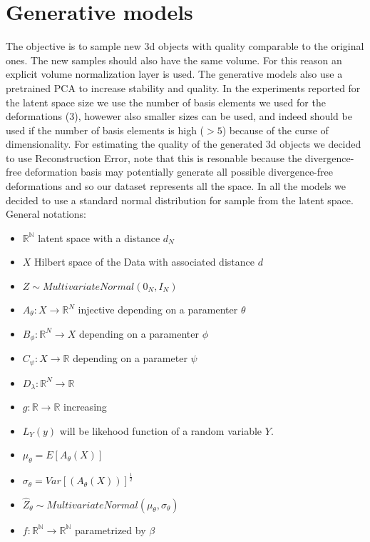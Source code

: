\documentclass{article}
\begin{document}
\section{Generative models}
The objective is to sample new 3d objects with quality comparable to the original ones. The new samples should also have the same volume.
For this reason an explicit volume normalization layer is used.
The generative models also use a pretrained PCA to increase stability and quality.
In the experiments reported for the latent space size we use the number of basis elements we used for the deformations (3), howewer also smaller sizes can be used, and indeed should be used if the number of basis elements is high ($>5$) because of the curse of dimensionality.  
For estimating the quality of the generated 3d objects we decided to use Reconstruction Error, note that this is resonable because the divergence-free deformation basis may potentially generate all possible divergence-free deformations and so our dataset represents all the space.
In all the models we decided to use a standard normal distribution for sample from the latent space.
General notations:
\begin{itemize}
\item $\mathbb{R^{N}}$ latent space with a distance $d_{N}$
\item $X$ Hilbert space of the Data with associated distance $d$
\item $Z\sim MultivariateNormal(0_{N},I_{N})$ 
\item $A_{\theta}:X \rightarrow \mathbb{R}^{N}$ injective depending on a paramenter $\theta$
\item $B_{\phi}:\mathbb{R}^{N} \rightarrow X$ depending on a paramenter $\phi$
\item $C_{\psi}:X \rightarrow \mathbb{R}$ depending on a parameter $\psi$
\item $D_{\lambda}: \mathbb{R}^{N} \rightarrow \mathbb{R}$
\item $g:\mathbb{R} \rightarrow \mathbb{R}$ increasing   
\item $L_{Y}(y)$ will be likehood function of a random variable $Y$.
\item $\mu_{\theta}= E[A_{\theta}(X)]$
\item $\sigma_{\theta}=Var[(A_{\theta}(X))]^{\frac{1}{2}}$
\item $\hat{Z}_{\theta}\sim MultivariateNormal(\mu_{\theta},\sigma_{\theta})$
\item $f:\mathbb{R^{N}} \rightarrow \mathbb{R^{N}}$ parametrized by $\beta$

\end{itemize}
\end{document}
